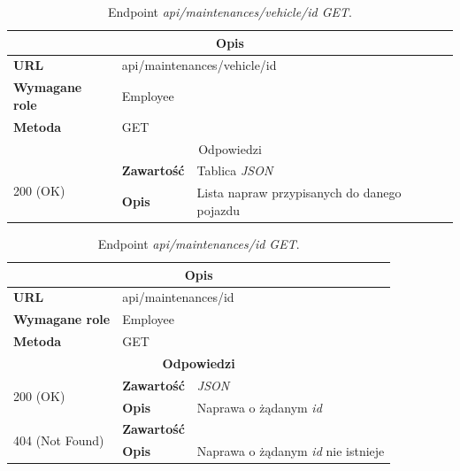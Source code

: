 \documentclass[eng,printmode,openany]{mgr}
\begin{document}
\begin{table}[H]
	\caption{Endpoint \textit{api/maintenances/vehicle/id GET}.}
	\begin{tabularx}{\textwidth}{|l|l|X|}
		\hline
		\multicolumn{3}{|c|}{\textbf{\textbf{Opis}}}
		\\ \hline
		\textbf{URL}                         & \multicolumn{2}{l|}{api/maintenances/vehicle/id}
		\\ \hline
		\textbf{Wymagane role}               & \multicolumn{2}{l|}{Employee}
		\\ \hline
		\textbf{Metoda}                      & \multicolumn{2}{l|}{GET}
		\\ \hline
		\multicolumn{3}{|c|}{ Odpowiedzi}
		\\ \hline
		\multirow{2}{*}{200 (OK)}   & \textbf{Zawartość}         & Tablica \textit{JSON}
		\\ \cline{2-3}              & \textbf{Opis}         	    & Lista napraw przypisanych do danego pojazdu
		\\ \hline
	\end{tabularx}
\end{table}

\begin{table}[H]
	\caption{Endpoint \textit{api/maintenances/id GET}.}
	\begin{tabularx}{\textwidth}{|l|l|X|}
		\hline
		\multicolumn{3}{|c|}{\textbf{\textbf{Opis}}}
		\\ \hline
		\textbf{URL}                         & \multicolumn{2}{l|}{api/maintenances/id}
		\\ \hline
		\textbf{Wymagane role}               & \multicolumn{2}{l|}{Employee}
		\\ \hline
		\textbf{Metoda}                      & \multicolumn{2}{l|}{GET}
		\\ \hline
		\multicolumn{3}{|c|}{\textbf{Odpowiedzi}}
		\\ \hline
		\multirow{2}{*}{200 (OK)} 	        & \textbf{Zawartość}   	& \textit{JSON}
		\\ \cline{2-3}                      & \textbf{Opis}         	& Naprawa o żądanym \textit{id}
		\\ \hline
		\multirow{2}{*}{404 (Not Found)} 	& \textbf{Zawartość}     & 
		\\ \cline{2-3}                      & \textbf{Opis}          & Naprawa o żądanym \textit{id} nie istnieje
		\\ \hline
	\end{tabularx}
\end{table}
\end{document}
